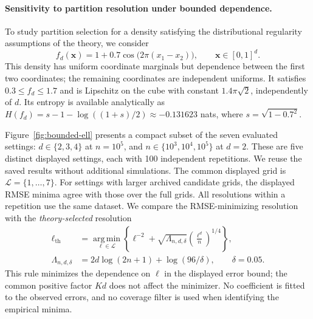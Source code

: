 
\paragraph{Sensitivity to partition resolution under bounded dependence.}
To study partition selection for a density satisfying the distributional
regularity assumptions of the theory, we consider
\begin{equation}
f_d(\mathbf{x})=1+0.7\cos\!\bigl(2\pi(x_1-x_2)\bigr),
\qquad \mathbf{x}\in[0,1]^d.
\label{eq:bounded-dependent-density}
\end{equation}
This density has uniform coordinate marginals but dependence between the
first two coordinates; the remaining coordinates are independent uniforms.
It satisfies $0.3\le f_d\le1.7$ and is Lipschitz on the cube with constant
$1.4\pi\sqrt{2}$, independently of $d$.
Its entropy is available analytically as
$H(f_d)=s-1-\log((1+s)/2)\approx-0.131623$ nats,
where $s=\sqrt{1-0.7^2}$.

Figure~\ref{fig:bounded-ell} presents a compact subset of the seven evaluated
settings: $d\in\{2,3,4\}$ at $n=10^5$, and
$n\in\{10^3,10^4,10^5\}$ at $d=2$.
These are five distinct displayed settings, each with 100 independent
repetitions. We reuse the saved results without additional simulations.
The common displayed grid is $\mathcal{L}=\{1,\ldots,7\}$.
For settings with larger archived candidate grids, the displayed RMSE
minima agree with those over the full grids.
All resolutions within a repetition use the same dataset.
We compare the RMSE-minimizing resolution with the \emph{theory-selected}
resolution
\begin{equation}
\begin{aligned}
\ell_{\mathrm{th}}
&=\underset{\ell\in\mathcal{L}}{\operatorname{arg\,min}}
\left\{\ell^{-2}+\sqrt{\Lambda_{n,d,\delta}}
\left(\frac{\ell^d}{n}\right)^{1/4}\right\},\\
\Lambda_{n,d,\delta}
&=2d\log(2n+1)+\log(96/\delta),\qquad\delta=0.05.
\end{aligned}
\label{eq:bounded-theory-ell}
\end{equation}
This rule minimizes the dependence on $\ell$ in the displayed error bound;
the common positive factor $Kd$ does not affect the minimizer.
No coefficient is fitted to the observed errors, and no coverage filter is
used when identifying the empirical minima.

